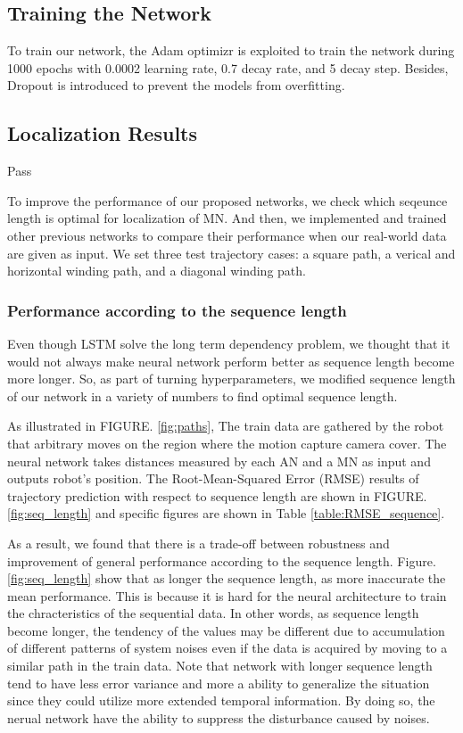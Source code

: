 \documentclass[letterpaper, 10 pt, conference]{ieeeconf}  %
\begin{document}
\subsection{Training the Network}

To train our network, the Adam optimizr is exploited to train the
network during 1000 epochs with 0.0002 learning rate, 0.7
decay rate, and 5 decay step. Besides, Dropout is introduced
to prevent the models from overfitting.

\subsection{Localization Results}

Pass


To improve the performance of our proposed networks, we check which seqeunce length is optimal for localization of MN. And then, we implemented and trained other previous networks to compare their performance when our real-world data are given as input. We set three test trajectory cases: a square path, a verical and horizontal winding path, and a diagonal winding path. 

\subsubsection{Performance according to the sequence length}

Even though LSTM solve the long term dependency problem, we thought that it would not always make neural network perform better as sequence length become more longer. So, as part of turning hyperparameters, we modified sequence length of our network in a variety of numbers to find optimal sequence length.   

As illustrated in FIGURE. \ref{fig:paths}, The train data are gathered by the robot that arbitrary moves on the region where the motion capture camera cover. The neural network takes distances measured by each AN and a MN as input and outputs robot's position. The Root-Mean-Squared Error (RMSE) results of trajectory prediction with respect to sequence length are shown in FIGURE. \ref{fig:seq_length} and specific figures are shown in Table \ref{table:RMSE_sequence}.

As a result, we found that there is a trade-off between robustness and improvement of general performance according to the sequence length. Figure. \ref{fig:seq_length} show that as longer the sequence length, as more inaccurate the mean performance. This is because it is hard for the neural architecture to train the chracteristics of the sequential data. In other words, as sequence length become longer, the tendency of the values may be different due to accumulation of different patterns of system noises even if the data is acquired by moving to a similar path in the train data. Note that network with longer sequence length tend to have less error variance and more a ability to generalize the situation since they could utilize more extended temporal information. By doing so, the nerual network have the ability to suppress the disturbance caused by noises.
\end{document}
